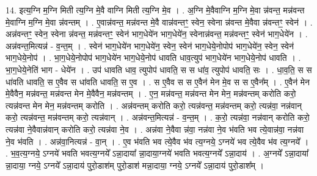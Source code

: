 \documentclass[17pt]{extarticle}
\begin{document}
14. इत्य॒ग्नि म॒ग्नि मिती त्य॒ग्नि मे॒वै वाग्नि मिती त्य॒ग्नि मे॒व । . अ॒ग्नि मे॒वैवाग्नि म॒ग्नि मे॒वा न्न॑वन्त॒ मन्न॑वन्त मे॒वाग्नि म॒ग्नि मे॒वा न्न॑वन्तम् । . ए॒वान्न॑वन्त॒ मन्न॑वन्त मे॒वै वान्न॑वन्तꣳ॒॒ स्वेन॒ स्वेना न्न॑वन्त मे॒वैवा न्न॑वन्तꣳ॒॒ स्वेन॑ । . अन्न॑वन्तꣳ॒॒ स्वेन॒ स्वेना न्न॑वन्त॒ मन्न॑वन्तꣳ॒॒ स्वेन॑ भाग॒धेये॑न भाग॒धेये॑न॒ स्वेनान्न॑वन्त॒ मन्न॑वन्तꣳ॒॒ स्वेन॑ भाग॒धेये॑न । . अन्न॑वन्त॒मित्यन्न॑ - व॒न्त॒म् । . स्वेन॑ भाग॒धेये॑न भाग॒धेये॑न॒ स्वेन॒ स्वेन॑ भाग॒धेये॒नोपोप॑ भाग॒धेये॑न॒ स्वेन॒ स्वेन॑ भाग॒धेये॒नोप॑ । . भा॒ग॒धेये॒नोपोप॑ भाग॒धेये॑न भाग॒धेये॒नोप॑ धावति धाव॒त्युप॑ भाग॒धेये॑न भाग॒धेये॒नोप॑ धावति । . भा॒ग॒धेये॒नेति॑ भाग - धेये॑न । . उप॑ धावति धाव॒ त्युपोप॑ धावति॒ स स धा॑व॒ त्युपोप॑ धावति॒ सः । . धा॒व॒ति॒ स स धा॑वति धावति॒ स ए॒वैव स धा॑वति धावति॒ स ए॒व । . स ए॒वैव स स ए॒वैन॑ मेन मे॒व स स ए॒वैन᳚म् । . ए॒वैन॑ मेन मे॒वैवैन॒ मन्न॑वन्त॒ मन्न॑वन्त मेन मे॒वैवैन॒ मन्न॑वन्तम् । . ए॒न॒ मन्न॑वन्त॒ मन्न॑वन्त मेन मेन॒ मन्न॑वन्तम् करोति करो॒ त्यन्न॑वन्त मेन मेन॒ मन्न॑वन्तम् करोति । . अन्न॑वन्तम् करोति करो॒ त्यन्न॑वन्त॒ मन्न॑वन्तम् करो॒ त्यन्न॑वा॒ नन्न॑वान् करो॒ त्यन्न॑वन्त॒ मन्न॑वन्तम् करो॒ त्यन्न॑वान् । . अन्न॑वन्त॒मित्यन्न॑ - व॒न्त॒म् । . क॒रो॒ त्यन्न॑वा॒ नन्न॑वान् करोति करो॒ त्यन्न॑वा ने॒वैवान्न॑वान् करोति करो॒ त्यन्न॑वा ने॒व । . अन्न॑वा ने॒वैवा न्न॑वा॒ नन्न॑वा ने॒व भ॑वति भव त्ये॒वान्न॑वा॒ नन्न॑वा ने॒व भ॑वति । . अन्न॑वा॒नित्यन्न॑ - वा॒न् । . ए॒व भ॑वति भव त्ये॒वैव भ॑व त्य॒ग्नये॒ ऽग्नये॑ भव त्ये॒वैव भ॑व त्य॒ग्नये᳚ । . भ॒व॒त्य॒ग्नये॒ ऽग्नये॑ भवति भवत्य॒ग्नये᳚ ऽन्ना॒दाया᳚ न्ना॒दाया॒ग्नये॑ भवति भवत्य॒ग्नये᳚ ऽन्ना॒दाय॑ । . अ॒ग्नये᳚ ऽन्ना॒दाया᳚ न्ना॒दाया॒ ग्नये॒ ऽग्नये᳚ ऽन्ना॒दाय॑ पुरो॒डाश॑म् पुरो॒डाश॑ मन्ना॒दाया॒ ग्नये॒ ऽग्नये᳚ ऽन्ना॒दाय॑ पुरो॒डाश᳚म् । \newline
\end{document}
